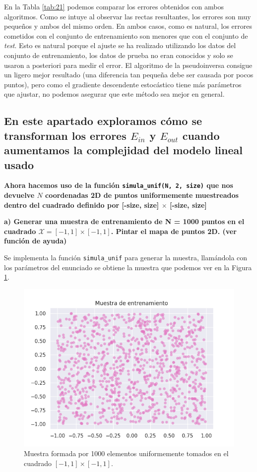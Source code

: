 \documentclass[a4paper, 20pt]{article}
\begin{document}
En la Tabla \ref{tab:21} podemos comparar los errores obtenidos con ambos algoritmos. Como se intuye al observar las rectas resultantes, los errores son muy pequeños y ambos del mismo orden. En ambos casos, como es natural, los errores cometidos con el conjunto de entrenamiento son menores que con el conjunto de \textit{test}. Esto es natural porque el ajuste se ha realizado utilizando los datos del conjunto de entrenamiento, los datos de prueba no eran conocidos y solo se usaron a posteriori para medir el error. El algoritmo de la pseudoinversa consigue un ligero mejor resultado (una diferencia tan pequeña debe ser causada por pocos puntos), pero como el gradiente descendente estocástico tiene más parámetros que ajustar, no podemos asegurar que este método sea mejor en general.

\subsection{En este apartado exploramos cómo se transforman los errores $E_{in}$ y $E_{out}$ cuando aumentamos la complejidad del modelo lineal usado}
\textbf{Ahora hacemos uso de la función \texttt{simula\_unif(N, 2, size)} que nos devuelve $N$ coordenadas 2D de puntos uniformemente muestreados dentro del cuadrado definido por [-size, size] $\times$ [-size, size]}

\textbf{a) Generar una muestra de entrenamiento de N = 1000 puntos en el cuadrado $\mathcal{X} = [-1, 1] \times [-1, 1]$. Pintar el mapa de puntos 2D. (ver función de ayuda)}

Se implementa la función \texttt{simula\_unif} para generar la muestra, llamándola con los parámetros del enunciado se obtiene la muestra que podemos ver en la Figura \ref{fig:22a}.

\begin{figure}[H]
    \centering
    \includegraphics[width=1\textwidth]{muestra2d}
    \caption{Muestra formada por 1000 elementos uniformemente tomados en el cuadrado $[-1,1]\times[-1,1]$.}
    \label{fig:22a}
\end{figure}
\end{document}

